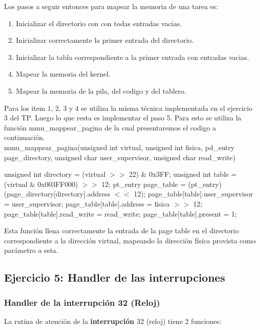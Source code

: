 \documentclass[a4paper,10pt,twoside]{article}
\newenvironment{pseudocodigo}
    {\vspace{0.5em} \begin{algorithmic}}
    {\end{algorithmic} \vspace{0.5em}}
\begin{document}
Los pasos a seguir entonces para mapear la memoria de una tarea es:

\begin{enumerate}
 \item Inicializar el directorio con con todas entradas vacias.
 \item Inicializar correctamente la primer entrada del directorio.
 \item Inicializar la tabla correspondiente a la primer entrada con entradas vacias.
 \item Mapear la memoria del kernel.
 \item Mapear la memoria de la pila, del codigo y del tablero.
\end{enumerate}

Para los item $1$, $2$, $3$ y $4$ se utiliza la misma técnica implementada en el ejercicio $3$ del TP.
Luego lo que resta es implementar el paso 5. Para esto se utiliza la función mmu\_mappear\_pagina de la cual presentaremos el codigo a continuación.\\

mmu\_mappear\_pagina(unsigned int virtual, unsigned int fisica, pd\_entry\* page\_directory, unsigned char user\_supervisor, unsigned char read\_write)
\begin{pseudocodigo}
  \STATE unsigned int directory = (virtual $>>$ 22) $\&$ 0x3FF;
  \STATE unsigned int table = (virtual $\&$ 0x003FF000) $>>$ 12;
  \STATE 
  \STATE pt\_entry\* page\_table = (pt\_entry\*) (page\_directory[directory].address $<<$ 12);
  \STATE 
  \STATE page\_table[table].user\_supervisor = user\_supervisor;
  \STATE page\_table[table].address = fisica $>>$ 12;
  \STATE page\_table[table].read\_write = read\_write;
  \STATE page\_table[table].present = 1;
\end{pseudocodigo}

Esta función llena correctamente la entrada de la page table en el directorio correspondiente a la dirección virtual, mapeando la dirección física provista como parámetro a esta.\\

\subsection{Ejercicio 5: Handler de las interrupciones}

\subsubsection{Handler de la interrupción 32 (Reloj)}
La rutina de atención de la \textbf{interrupción $32$} (reloj) tiene 2 funciones:
\end{document}
